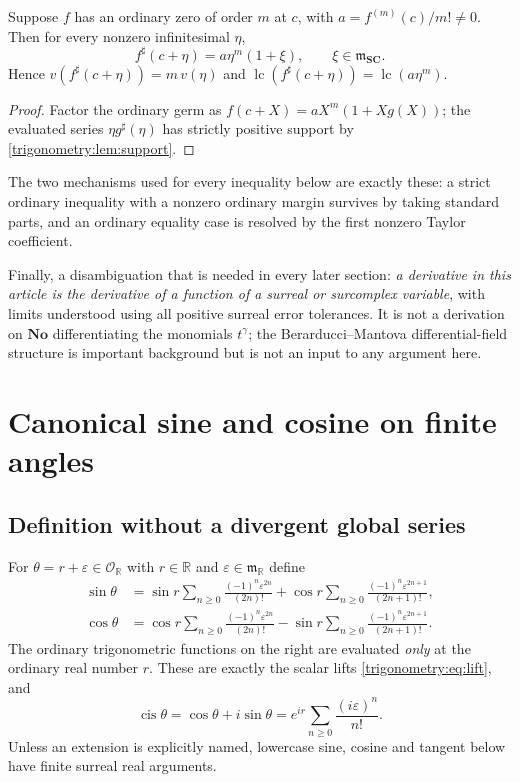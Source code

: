 \documentclass[11pt,letterpaper]{article}
\numberwithin{equation}{section}
\theoremstyle{definition}
\theoremstyle{remark}
\newcommand{\No}{\mathbf{No}}
\newcommand{\SC}{\mathbf{SC}}
\newcommand{\R}{\mathbb R}
\newcommand{\OO}{\mathcal O}
\newcommand{\mm}{\mathfrak m}
\newcommand{\eps}{\varepsilon}
\newcommand{\lc}{\operatorname{lc}}
\newcommand{\cis}{\operatorname{cis}}
\newcommand{\sh}{^{\sharp}}
\begin{document}
\begin{lemma}\label{trigonometry:lem:leading}
Suppose $f$ has an ordinary zero of order $m$ at $c$, with $a=f^{(m)}(c)/m!\ne0$. Then for every
nonzero infinitesimal $\eta$,
\[
 f\sh(c+\eta)=a\eta^m(1+\xi),\qquad\xi\in\mm_{\SC}.
\]
Hence $v(f\sh(c+\eta))=m\,v(\eta)$ and $\lc(f\sh(c+\eta))=\lc(a\eta^m)$.
\end{lemma}
\begin{proof}
Factor the ordinary germ as $f(c+X)=aX^m(1+Xg(X))$; the evaluated series $\eta g\sh(\eta)$ has
strictly positive support by \cref{trigonometry:lem:support}.
\end{proof}
The two mechanisms used for every inequality below are exactly these: a strict ordinary inequality
with a nonzero ordinary margin survives by taking standard parts, and an ordinary equality case is
resolved by the first nonzero Taylor coefficient.

Finally, a disambiguation that is needed in every later section: \emph{a derivative in this article
is the derivative of a function of a surreal or surcomplex variable}, with limits understood using
all positive surreal error tolerances. It is not a derivation on $\No$ differentiating the
monomials $t^\gamma$; the Berarducci--Mantova differential-field structure \cite{BM} is important
background but is not an input to any argument here.

\section{Canonical sine and cosine on finite angles}\label{trigonometry:sec:finite}

\subsection{Definition without a divergent global series}
For $\theta=r+\eps\in\OO_{\R}$ with $r\in\R$ and $\eps\in\mm_{\R}$ define
\begin{align}
 \sin\theta&=\sin r\sum_{n\ge0}\frac{(-1)^n\eps^{2n}}{(2n)!}
 +\cos r\sum_{n\ge0}\frac{(-1)^n\eps^{2n+1}}{(2n+1)!},\label{trigonometry:eq:sinfinite}\\
 \cos\theta&=\cos r\sum_{n\ge0}\frac{(-1)^n\eps^{2n}}{(2n)!}
 -\sin r\sum_{n\ge0}\frac{(-1)^n\eps^{2n+1}}{(2n+1)!}.\label{trigonometry:eq:cosfinite}
\end{align}
The ordinary trigonometric functions on the right are evaluated \emph{only} at the ordinary real
number $r$. These are exactly the scalar lifts \cref{trigonometry:eq:lift}, and
\begin{equation}\label{trigonometry:eq:finiteEuler}
 \cis\theta=\cos\theta+i\sin\theta=e^{ir}\sum_{n\ge0}\frac{(i\eps)^n}{n!}.
\end{equation}
Unless an extension is explicitly named, lowercase sine, cosine and tangent below have finite
surreal real arguments.
\end{document}

